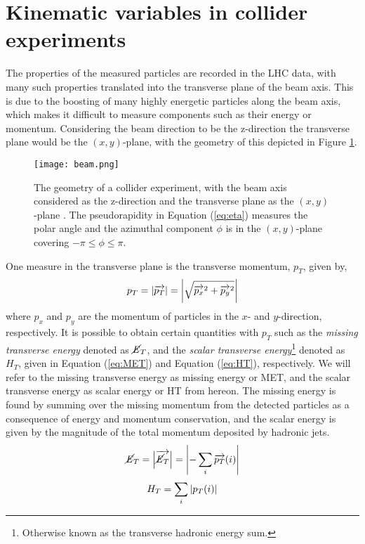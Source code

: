 \section{Kinematic variables in collider experiments}
The properties of the measured particles are recorded in the LHC data, with many such properties translated into the transverse plane of the beam axis. This is due to the boosting of many highly energetic particles along the beam axis, which makes it difficult to measure components such as their energy or momentum. Considering the beam direction to be the z-direction the transverse plane would be the $(x,y)$-plane, with the geometry of this depicted in Figure \ref{fig:beam}. \\

\begin{figure}[htbp]
    \centering
    \texttt{[image: beam.png]}
    \caption{The geometry of a collider experiment, with the beam axis considered as the z-direction and the transverse plane as the $(x,y)$-plane \cite{barr2011guide}. The pseudorapidity in Equation (\ref{eq:eta}) measures the polar angle and the azimuthal component $\phi$ is in the $(x,y)$-plane covering $-\pi \leq \phi \leq \pi$. }
    \label{fig:beam}
\end{figure}

One measure in the transverse plane is the transverse momentum, $p_T$, given by, 
\begin{equation}
    p_T = \abs{\overrightarrow{p_T}} = \abs{\sqrt{\overrightarrow{p_x}^2 + \overrightarrow{p_y}^2}}
    \label{eq:pt}
\end{equation}
where $p_x$ and $p_y$ are the momentum of particles in the $x$- and $y$-direction, respectively. It is possible to obtain certain quantities with $p_T$ such as the \textit{missing transverse energy} denoted as $\cancel{\it{E}}_{T}$, and the \textit{scalar transverse energy}\footnote{Otherwise known as the transverse hadronic energy sum.} denoted as $H_T$, given in Equation (\ref{eq:MET}) and Equation (\ref{eq:HT}), respectively. We will refer to the missing transverse energy as missing energy or MET, and the scalar transverse energy as scalar energy or HT from hereon. The missing energy is found by summing over the missing momentum from the detected particles as a consequence of energy and momentum conservation, and the scalar energy is given by the magnitude of the total momentum deposited by hadronic jets. \\
\begin{equation}
    \cancel{\it{E}}_{T} = \abs{\overrightarrow{\cancel{\it{E}}_{T}}} = \abs{- \sum_i \overrightarrow{p_T}(i)}
    \label{eq:MET}
\end{equation}
\begin{equation}
    H_T = \sum_i \abs{p_T(i)} 
    \label{eq:HT}
\end{equation}

